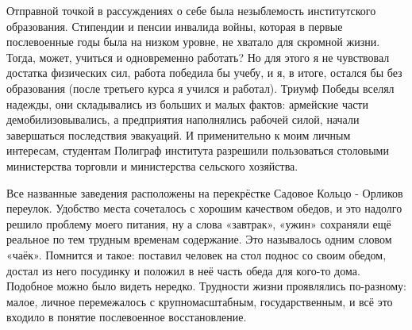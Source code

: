 \label{276-1}
Отправной точкой в рассуждениях о себе была незыблемость институтского образования. Стипендии и пенсии инвалида войны, которая в первые послевоенные годы была на низком уровне, не хватало для скромной жизни. Тогда, может, учиться и одновременно работать? Но для этого я не чувствовал достатка физических сил, работа победила бы учебу, и я, в итоге, остался бы без образования (после третьего курса я учился и работал). Триумф Победы вселял надежды, они складывались из больших и малых фактов: армейские части демобилизовывались, а предприятия наполнялись рабочей силой, начали завершаться последствия эвакуаций. И применительно к моим личным интересам, студентам Полиграф института разрешили пользоваться столовыми министерства торговли и министерства сельского хозяйства.

\label{277-1}
Все названные заведения расположены на перекрёстке Садовое Кольцо - Орликов переулок. Удобство места сочеталось с хорошим качеством обедов, и это надолго решило проблему моего питания, ну а слова «завтрак», «ужин» сохраняли ещё реальное по тем трудным временам содержание. Это называлось одним словом «чаёк». Помнится и такое: поставил человек на стол поднос со своим обедом, достал из него посудинку и положил в неё часть обеда для кого-то дома. Подобное можно было видеть нередко. Трудности жизни проявлялись по-разному: малое, личное перемежалось с крупномасштабным, государственным, и всё это входило в понятие послевоенное восстановление.
